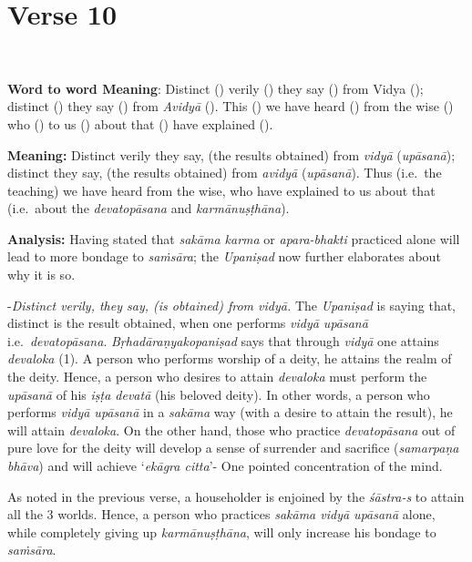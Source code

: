 \chapter{Verse 10}

\begin{moolashloka}
\\
\end{moolashloka}

\textbf{Word to word Meaning}: Distinct () verily () they say () from Vidya (); distinct () they say () from \emph{Avidyā} (). This () we have heard () from the wise () who () to us () about that () have explained ().
\vskip 2pt

\textbf{Meaning:} Distinct verily they say, (the results obtained) from \emph{vidyā} (\emph{upāsanā}); distinct they say, (the results obtained) from \emph{avidyā} (\emph{upāsanā}). Thus (i.e.\ the teaching) we have heard from the wise, who have explained to us about that (i.e.\ about the \emph{devatopāsana} and \emph{karmānuṣṭhāna}).
\vskip 2pt

\textbf{Analysis:} Having stated that \emph{sakāma karma} or \emph{apara-bhakti} practiced alone will lead to more bondage to \emph{saṁsāra}; the \emph{Upaniṣad} now further elaborates about why it is so.
\vskip 2pt

-\emph{Distinct verily, they say, (is obtained) from vidyā.} The \emph{Upaniṣad} is saying that, distinct is the result obtained, when one performs \emph{vidyā upāsanā} i.e.\ \emph{devatopāsana}. \emph{Bṛhadāraṇyakopaniṣad} says that through \emph{vidyā} one attains \emph{devaloka} (1). A person who performs worship of a deity, he attains the realm of the deity. Hence, a person who desires to attain \emph{devaloka} must perform the \emph{upāsanā} of his \emph{iṣṭa devatā} (his beloved deity). In other words, a person who performs \emph{vidyā upāsanā} in a \emph{sakāma} way (with a desire to attain the result), he will attain \emph{devaloka}. On the other hand, those who practice \emph{devatopāsana} out of pure love for the deity will develop a sense of surrender and sacrifice (\emph{samarpaṇa bhāva}) and will achieve `\emph{ekāgra citta}'- One pointed concentration of the mind.

As noted in the previous verse, a householder is enjoined by the \emph{śāstra-s} to attain all the 3 worlds. Hence, a person who practices \emph{sakāma vidyā upāsanā} alone, while completely giving up \emph{karmānuṣṭhāna}, will only increase his bondage to \emph{saṁsāra}.

